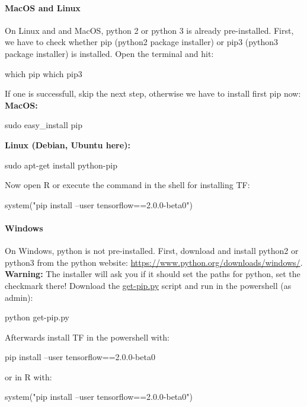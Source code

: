 \documentclass[a4paper,twoside]{tufte-book}\usepackage[]{graphicx}\usepackage[]{color}
\begin{document}
\paragraph{MacOS and Linux}\label{Mac} 
On Linux and and MacOS, python 2 or python 3 is already pre-installed.
%
First, we have to check whether pip (python2 package installer) or pip3 (python3 package installer) is installed. 
%
Open the terminal and hit:
\begin{Schunk}
\begin{Sinput}
which pip 
which pip3
\end{Sinput}
\end{Schunk}
If one is successfull, skip the next step, otherwise we have to install first pip now:
%
\textbf{MacOS: }
\begin{Schunk}
\begin{Sinput}
sudo easy_install pip
\end{Sinput}
\end{Schunk}
%

\textbf{Linux (Debian, Ubuntu here): }
\begin{Schunk}
\begin{Sinput}
sudo apt-get install python-pip
\end{Sinput}
\end{Schunk}
%
Now open R or execute the command in the shell for installing TF:
\begin{Schunk}
\begin{Sinput}
system("pip install --user tensorflow==2.0.0-beta0")
\end{Sinput}
\end{Schunk}



\paragraph{Windows}\label{Windows} 
On Windows, python is not pre-installed. 
%
First, download and install python2 or python3 from the python website: \href{https://www.python.org/downloads/windows/}{https://www.python.org/downloads/windows/}. 
%
\textbf{Warning:} The installer will ask you if it should set the paths for python, set the checkmark there!
%
Download the \href{https://bootstrap.pypa.io/get-pip.py}{get-pip.py} script and run in the powershell (as admin):
%
\begin{Schunk}
\begin{Sinput}
python get-pip.py
\end{Sinput}
\end{Schunk}
%
Afterwards install TF in the powershell with:
\begin{Schunk}
\begin{Sinput}
pip install --user tensorflow==2.0.0-beta0
\end{Sinput}
\end{Schunk}
%
or in R with:
\begin{Schunk}
\begin{Sinput}
system("pip install --user tensorflow==2.0.0-beta0")
\end{Sinput}
\end{Schunk}
\end{document}
